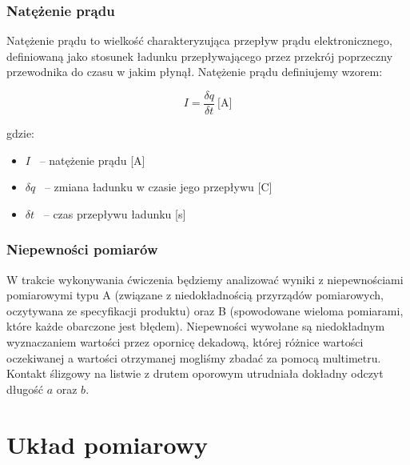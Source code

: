 \documentclass[a4paper,12pts]{article}
\begin{document}

	\subsubsection{Natężenie prądu}
	
	Natężenie prądu to wielkość charakteryzująca przepływ prądu elektronicznego, definiowaną jako stosunek ładunku przepływającego przez przekrój poprzeczny przewodnika do czasu w jakim płynął. Natężenie prądu definiujemy wzorem:
	
	\begin{equation}
		I = \frac{\delta q}{\delta t} ~\textrm{[A]}
	\end{equation}
	
	gdzie:
	\begin{itemize}
		\item $I$ ~-- natężenie prądu [A]
		\item $\delta q$ ~-- zmiana ładunku w czasie jego przepływu [C]
		\item $\delta t$ ~-- czas przepływu ładunku [s]
	\end{itemize}


	\subsubsection{Niepewności pomiarów}
	
	W trakcie wykonywania ćwiczenia będziemy analizować wyniki z niepewnościami pomiarowymi typu A (związane z niedokładnością przyrządów pomiarowych, oczytywana ze specyfikacji produktu) oraz B (spowodowane wieloma pomiarami, które każde obarczone jest błędem). Niepewności wywołane są niedokładnym wyznaczaniem wartości przez opornicę dekadową, której różnice wartości oczekiwanej a wartości otrzymanej mogliśmy zbadać za pomocą multimetru. Kontakt ślizgowy na listwie z drutem oporowym utrudniała dokładny odczyt długość $a$ oraz $b$. 
	
	
	\section{Układ pomiarowy}
	
\end{document}
